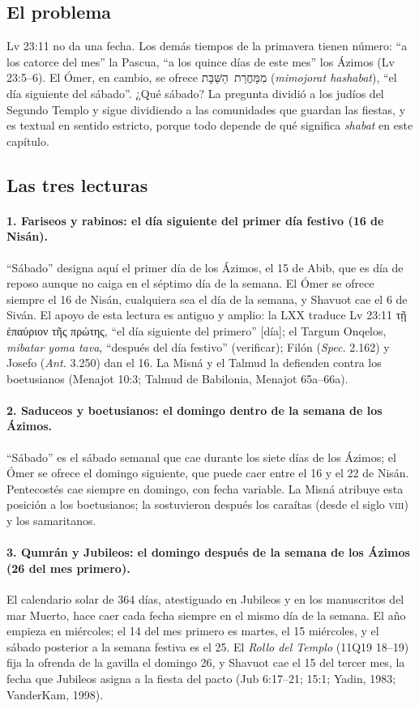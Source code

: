 \documentclass[11pt,letterpaper]{article}
\newcommand{\heb}[1]{\mbox{\foreignlanguage{hebrew}{#1}}}
\newcommand{\grc}[1]{\foreignlanguage{ancientgreek}{#1}}
\begin{document}
\subsection{El problema}
Lv 23:11 no da una fecha. Los demás tiempos de la primavera tienen número: ``a los catorce del mes'' la Pascua, ``a los quince días de este mes'' los Ázimos (Lv 23:5--6). El Ómer, en cambio, se ofrece \heb{מִמָּחֳרַת הַשַּׁבָּת} (\emph{mimojorat hashabat}), ``el día siguiente del sábado''. ¿Qué sábado? La pregunta dividió a los judíos del Segundo Templo y sigue dividiendo a las comunidades que guardan las fiestas, y es textual en sentido estricto, porque todo depende de qué significa \emph{shabat} en este capítulo.

\subsection{Las tres lecturas}

\paragraph{1. Fariseos y rabinos: el día siguiente del primer día festivo (16 de Nisán).} ``Sábado'' designa aquí el primer día de los Ázimos, el 15 de Abib, que es día de reposo aunque no caiga en el séptimo día de la semana. El Ómer se ofrece siempre el 16 de Nisán, cualquiera sea el día de la semana, y Shavuot cae el 6 de Siván. El apoyo de esta lectura es antiguo y amplio: la LXX traduce Lv 23:11 \grc{τῇ ἐπαύριον τῆς πρώτης}, ``el día siguiente del primero'' [día]; el Targum Onqelos, \emph{mibatar yoma tava}, ``después del día festivo'' (verificar); Filón (\emph{Spec.} 2.162) y Josefo (\emph{Ant.} 3.250) dan el 16. La Misná y el Talmud la defienden contra los boetusianos (Menajot 10:3; Talmud de Babilonia, Menajot 65a--66a).

\paragraph{2. Saduceos y boetusianos: el domingo dentro de la semana de los Ázimos.} ``Sábado'' es el sábado semanal que cae durante los siete días de los Ázimos; el Ómer se ofrece el domingo siguiente, que puede caer entre el 16 y el 22 de Nisán. Pentecostés cae siempre en domingo, con fecha variable. La Misná atribuye esta posición a los boetusianos; la sostuvieron después los caraítas (desde el siglo \textsc{viii}) y los samaritanos.

\paragraph{3. Qumrán y Jubileos: el domingo después de la semana de los Ázimos (26 del mes primero).} El calendario solar de 364 días, atestiguado en Jubileos y en los manuscritos del mar Muerto, hace caer cada fecha siempre en el mismo día de la semana. El año empieza en miércoles; el 14 del mes primero es martes, el 15 miércoles, y el sábado posterior a la semana festiva es el 25. El \emph{Rollo del Templo} (11Q19 18--19) fija la ofrenda de la gavilla el domingo 26, y Shavuot cae el 15 del tercer mes, la fecha que Jubileos asigna a la fiesta del pacto (Jub 6:17--21; 15:1; Yadin, 1983; VanderKam, 1998).
\end{document}
